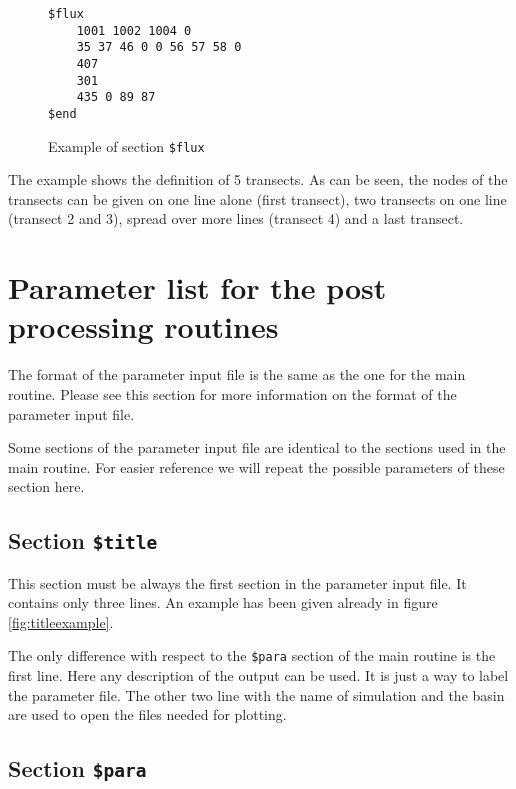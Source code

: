 \documentclass{report}
\begin{document}
\begin{figure}[ht]
\begin{verbatim}
$flux
	1001 1002 1004 0
	35 37 46 0 0 56 57 58 0
	407
	301
	435 0 89 87
$end
\end{verbatim}
\caption{Example of section {\tt \$flux}}
\label{fig:fluxexample}
\end{figure}

The example shows the definition of 5 transects. As can be seen, the 
nodes of the transects can be given on one line alone (first transect),
two transects on one line (transect 2 and 3), spread over more lines
(transect 4) and a last transect.



\section{Parameter list for the post processing routines}

The format of the parameter input file is the same as the one for
the main routine. Please see this section for more information
on the format of the parameter input file.

Some sections of the parameter input file are identical to the 
sections used in the main routine. For easier reference we will
repeat the possible parameters of these section here.






\subsection{Section {\tt \$title}}

This section must be always the first section in the parameter input file.
It contains only three lines. An example has been given already in 
figure \ref{fig:titleexample}.

The only difference with respect to the {\tt \$para} section of the main
routine is the first line. Here any description of the output can be used.
It is just a way to label the parameter file.  The other two line with
the name of simulation and the basin are used to open the files needed
for plotting.


\subsection{Section {\tt \$para}}


\end{document}
